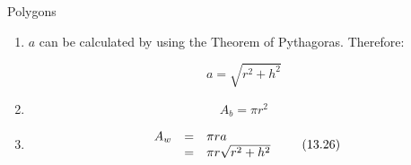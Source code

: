 \begin{exercises}{Polygons}
{\begin{mdframed}[linewidth=4, leftmargin=40, rightmargin=40]
\begin{exercise}
\begin{enumerate}[noitemsep, label=\textbf{Step} \textbf{\arabic*}. ]
    \setcounter{subfigure}{0}


	\begin{figure}[H] %
    \begin{center}
    \label{m39357*id62779!!!underscore!!!media}\label{m39357*id62779!!!underscore!!!printimage}\texttt{[image: col11306.imgs/m39357\_MG11C16\_003.png]} %
        
      \vspace{2pt}
    \vspace{.1in}
    
    \end{center}

 \end{figure}   

    \addtocounter{footnote}{-0}
    
      \par 
      \label{m39357*id62785}This curved surface can be cut into many thin triangles with height close to $a$ ($a$ is called the \textsl{slant height}). The area of these triangles will add up to $\frac{1}{2}\ensuremath{\times}$base$\ensuremath{\times}$height(of a small triangle) which is $\frac{1}{2}\ensuremath{\times}2\pi r\ensuremath{\times}a=\pi ra$\par 
      \item  
      \label{m39357*id62881}$a$ can be calculated by using the Theorem of Pythagoras. Therefore:\par 
      \label{m39357*id62892}\nopagebreak\noindent{}
        
    \begin{equation}
    a=\sqrt{{r}^{2}+{h}^{2}}\tag{13.24}
      \end{equation}
    
      
      \item  
      \label{m39357*id62928}\nopagebreak\noindent{}
        
    \begin{equation}
    {A}_{b}=\pi {r}^{2}\tag{13.25}
      \end{equation}
    
      
      \item  
      \label{m39357*id62960}\nopagebreak\noindent{}
        
    \begin{equation}
    \begin{array}{ccc}\hfill {A}_{w}& =& \pi ra\hfill \\ & =& \pi r\sqrt{{r}^{2}+{h}^{2}}\hfill \end{array}\tag{13.26}
      \end{equation}
    

\end{enumerate}
\end{exercise}
\end{mdframed}}
\end{exercises}
